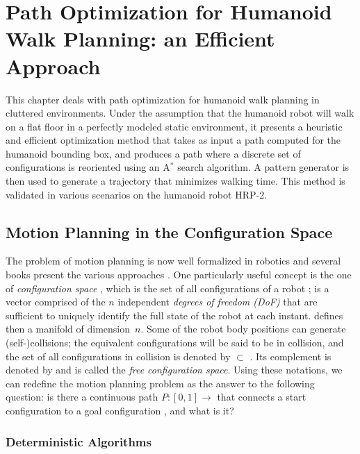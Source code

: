 \chapter{Path Optimization for Humanoid Walk Planning: an Efficient Approach}
\label{chap:path-optim}

This chapter deals with path optimization for humanoid walk planning
in cluttered environments. Under the assumption that the humanoid
robot will walk on a flat floor in a perfectly modeled static
environment, it presents a heuristic and efficient optimization method
that takes as input a path computed for the humanoid bounding box, and
produces a path where a discrete set of configurations is reoriented
using an A$^{*}$ search algorithm. A pattern generator is then used to
generate a trajectory that minimizes walking time. This method is
validated in various scenarios on the humanoid robot HRP-2.

\section{Motion Planning in the Configuration Space}
\label{sec:chap1-motion-planning}

The problem of motion planning is now well formalized in robotics and
several books present the various approaches
\cite{lato91,chos05,lava06}. One particularly useful concept is the
one of \emph{configuration space} {\cspace} \cite{loza83}, which is
the set of all configurations \config{} of a robot {\robot}; \config{}
is a vector comprised of the $n$ independent \emph{degrees of freedom
  (DoF)} that are sufficient to uniquely identify the full state of
the robot at each instant. {\cspace} defines then a manifold of
dimension~$n$. Some of the robot body positions can generate
(self-)collisions; the equivalent configurations will be said to be in
collision, and the set of all configurations in collision is denoted
by {\cobs} $\subset$ {\cspace}. Its complement is denoted by {\cfree}
and is called the \emph{free configuration space}. Using these
notations, we can redefine the motion planning problem as the answer
to the following question: is there a continuous path $P: [0,1]
\rightarrow$ {\cfree} that connects a start configuration 
to a goal configuration , and what is it?

\subsection{Deterministic Algorithms}
\label{subsec:chap1-deterministic algorithms}

